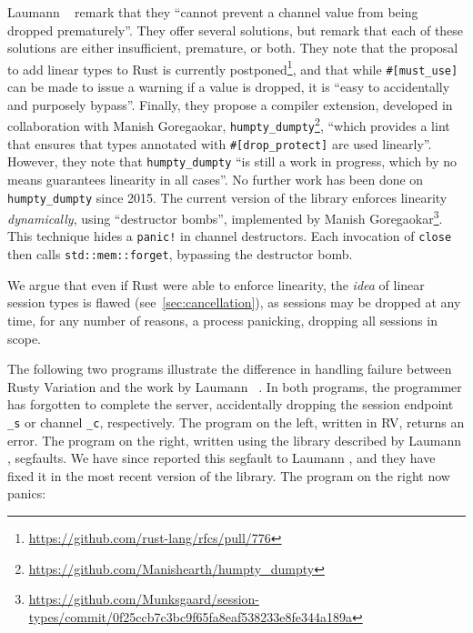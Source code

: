 \documentclass[copyright,creativecommons]{eptcs}
\begin{document}
Laumann \etal~\cite{jespersen2015} remark that they ``cannot prevent a channel value from being dropped prematurely''. They offer several solutions, but remark that each of these solutions are either insufficient, premature, or both. They note that the proposal to add linear types to Rust is currently postponed\footnote{\url{https://github.com/rust-lang/rfcs/pull/776}}, and that while \lstinline{#[must_use]} can be made to issue a warning if a value is dropped, it is ``easy to accidentally and purposely bypass''. Finally, they propose a compiler extension, developed in collaboration with Manish Goregaokar, \lstinline{humpty_dumpty}\footnote{\url{https://github.com/Manishearth/humpty_dumpty}}, ``which provides a lint that ensures that types annotated  with \lstinline{#[drop_protect]} are used linearly''. However, they note that \lstinline{humpty_dumpty} ``is still a work in progress, which by no means guarantees linearity in all cases''. No further work has been done on \lstinline{humpty_dumpty} since 2015. The current version of the library enforces linearity \emph{dynamically}, using ``destructor bombs'', implemented by Manish Goregaokar\footnote{\url{https://github.com/Munksgaard/session-types/commit/0f25ccb7c3bc9f65fa8eaf538233e8fe344a189a}}. This technique hides a \lstinline{panic!} in channel destructors. Each invocation of \lstinline{close} then calls \lstinline{std::mem::forget}, bypassing the destructor bomb.

We argue that even if Rust were able to enforce linearity, the \emph{idea} of linear session types is flawed (see~\cref{sec:cancellation}), as sessions may be dropped at any time, for any number of reasons, \eg a process panicking, dropping all sessions in scope.

The following two programs illustrate the difference in handling failure between Rusty Variation and the work by Laumann \etal~\cite{jespersen2015}. In both programs, the programmer has forgotten to complete the server, accidentally dropping the session endpoint \lstinline{_s} or channel \lstinline{_c}, respectively. The program on the left, written in RV, returns an error. The program on the right, written using the library described by Laumann \etal\cite{jespersen2015}, segfaults. We have since reported this segfault to Laumann \etal, and they have fixed it in the most recent version of the library. The program on the right now panics:
\end{document}
